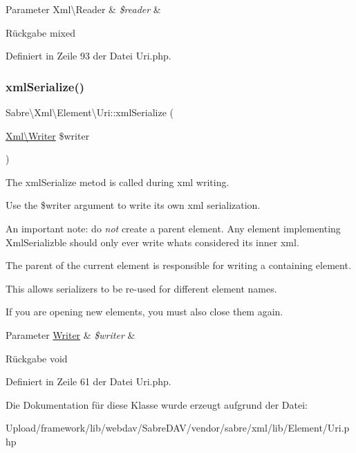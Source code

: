 \begin{DoxyParams}[1]{Parameter}
Xml\textbackslash{}\+Reader & {\em \$reader} & \\
\hline
\end{DoxyParams}
\begin{DoxyReturn}{Rückgabe}
mixed 
\end{DoxyReturn}


Definiert in Zeile 93 der Datei Uri.\+php.

\mbox{\label{class_sabre_1_1_xml_1_1_element_1_1_uri_a8a263d4d494ebf339ef91187426af679}} 
\subsubsection{\texorpdfstring{xml\+Serialize()}{xmlSerialize()}}
{\footnotesize\ttfamily Sabre\textbackslash{}\+Xml\textbackslash{}\+Element\textbackslash{}\+Uri\+::xml\+Serialize (\begin{DoxyParamCaption}\item[{\mbox{\hyperlink{class_sabre_1_1_xml_1_1_writer}{Xml\textbackslash{}\+Writer}}}]{\$writer }\end{DoxyParamCaption})}

The xml\+Serialize metod is called during xml writing.

Use the \$writer argument to write its own xml serialization.

An important note\+: do {\itshape not} create a parent element. Any element implementing Xml\+Serializble should only ever write what\textquotesingle{}s considered its \textquotesingle{}inner xml\textquotesingle{}.

The parent of the current element is responsible for writing a containing element.

This allows serializers to be re-\/used for different element names.

If you are opening new elements, you must also close them again.


\begin{DoxyParams}[1]{Parameter}
\mbox{\hyperlink{class_sabre_1_1_xml_1_1_writer}{Writer}} & {\em \$writer} & \\
\hline
\end{DoxyParams}
\begin{DoxyReturn}{Rückgabe}
void 
\end{DoxyReturn}


Definiert in Zeile 61 der Datei Uri.\+php.



Die Dokumentation für diese Klasse wurde erzeugt aufgrund der Datei\+:\begin{DoxyCompactItemize}
\item 
Upload/framework/lib/webdav/\+Sabre\+D\+A\+V/vendor/sabre/xml/lib/\+Element/Uri.\+php\end{DoxyCompactItemize}
